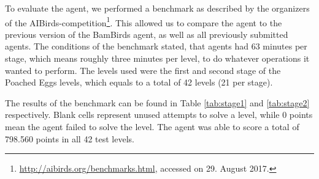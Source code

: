 

To evaluate the agent, we performed a benchmark as described by the organizers of the AIBirds-competition\footnote{\url{http://aibirds.org/benchmarks.html}, accessed on 29. August 2017.}. This allowed us to compare the agent to the previous version of the BamBirds agent, as well as all previously submitted agents. The conditions of the benchmark stated, that agents had 63 minutes per stage, which means roughly three minutes per level, to do whatever operations it wanted to perform. The levels used were the first and second stage of the Poached Eggs levels, which equals to a total of 42 levels (21 per stage).

The results of the benchmark can be found in Table \ref{tab:stage1} and \ref{tab:stage2} respectively. Blank cells represent unused attempts to solve a level, while 0 points mean the agent failed to solve the level. The agent was able to score a total of 798.560 points in all 42 test levels.\\


